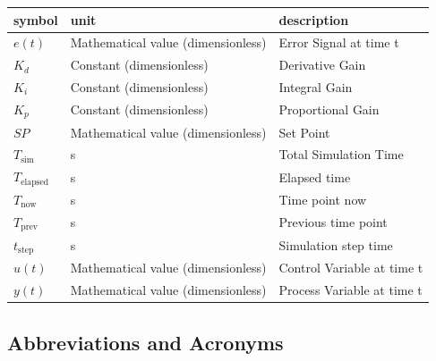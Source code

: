 \documentclass[12pt]{article}
\begin{document}
\renewcommand{\arraystretch}{1.2}
\noindent \begin{longtable*}{l l p{12cm}} \toprule
\textbf{symbol} & \textbf{unit} & \textbf{description}\\
\midrule
$e(t)$ & Mathematical value (dimensionless) & Error Signal at time t
\\
$K_d$ & Constant (dimensionless) & Derivative Gain
\\
$K_i$ &  Constant (dimensionless) & Integral Gain
\\
$K_p$ &  Constant (dimensionless) & Proportional Gain
\\
$SP$ & Mathematical value (dimensionless) & Set Point
\\
$T_\text{sim}$ & \si[per-mode=symbol] {\second} & Total Simulation Time
\\
$T_\text{elapsed}$ & \si[per-mode=symbol] {\second} & Elapsed time
\\
$T_\text{now}$ & \si[per-mode=symbol] {\second} & Time point now
\\ 
$T_\text{prev}$ & \si[per-mode=symbol] {\second} & Previous time point
\\
$t_\text{step}$ & \si[per-mode=symbol] {\second} & Simulation step time
\\
$u(t)$ & Mathematical value (dimensionless) & Control Variable at time t
\\
$y(t)$ & Mathematical value (dimensionless) & Process Variable at time t
\\ 
\bottomrule
\end{longtable*}

\subsection{Abbreviations and Acronyms}
\end{document}
